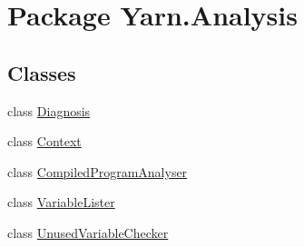 \hypertarget{a00342}{\section{Package Yarn.\-Analysis}
\label{a00342}
}
\subsection*{Classes}
\begin{DoxyCompactItemize}
\item 
class \hyperlink{a00087}{Diagnosis}
\item 
class \hyperlink{a00054}{Context}
\item 
class \hyperlink{a00050}{Compiled\-Program\-Analyser}
\item 
class \hyperlink{a00166}{Variable\-Lister}
\item 
class \hyperlink{a00163}{Unused\-Variable\-Checker}
\end{DoxyCompactItemize}
